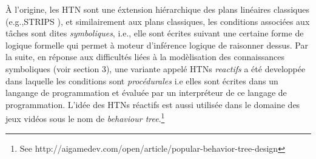 \documentclass[a4paper,twoside,french]{article}
\begin{document}
				\`A l'origine, les HTN sont une \'extension hi\'erarchique des plans lin\'eaires classiques (e.g.,STRIPS \cite{fikes1972strips} ), et similairement aux plans classiques, les conditions associ\'ees aux t\^aches sont dites \textit{symboliques}, i.e., elle sont \'ecrites suivant une certaine forme de logique formelle qui permet à moteur d'inf\'erence logique de raisonner dessus. Par la suite, en r\'eponse aux difficult\'es li\'ees \`a la mod\`elisation des connaissances symboliques (voir section 3), une variante appel\'e HTNs \textit{reactifs} a \'et\'e developp\'ee dans laquelle les conditions sont \textit{proc\'edurales} i.e elles sont \'ecrites dans un langange de programmation et \'evalu\'ee par un interpr\'eteur de ce langage de programmation. L'id\'ee des HTNs réactifs est aussi utilis\'ee dans le domaine des jeux vid\'eos sous le nom de \emph{behaviour tree}.\footnote{See http://aigamedev.com/open/article/popular-behavior-tree-design}
				
\end{document}
